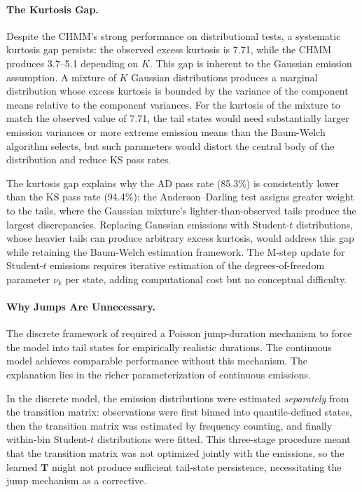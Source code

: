 \paragraph{The Kurtosis Gap.}
Despite the CHMM's strong performance on distributional tests, a systematic kurtosis gap persists: the observed excess kurtosis is 7.71, while the CHMM produces 3.7--5.1 depending on $K$.
This gap is inherent to the Gaussian emission assumption.
A mixture of $K$ Gaussian distributions produces a marginal distribution whose excess kurtosis is bounded by the variance of the component means relative to the component variances.
For the kurtosis of the mixture to match the observed value of 7.71, the tail states would need substantially larger emission variances or more extreme emission means than the Baum-Welch algorithm selects, but such parameters would distort the central body of the distribution and reduce KS pass rates.

The kurtosis gap explains why the AD pass rate (85.3\%) is consistently lower than the KS pass rate (94.4\%): the Anderson--Darling test assigns greater weight to the tails, where the Gaussian mixture's lighter-than-observed tails produce the largest discrepancies.
Replacing Gaussian emissions with Student-$t$ distributions, whose heavier tails can produce arbitrary excess kurtosis, would address this gap while retaining the Baum-Welch estimation framework.
The M-step update for Student-$t$ emissions requires iterative estimation of the degrees-of-freedom parameter $\nu_k$ per state, adding computational cost but no conceptual difficulty.

\paragraph{Why Jumps Are Unnecessary.}
The discrete framework of \citet{alswaidan2026hybrid} required a Poisson jump-duration mechanism to force the model into tail states for empirically realistic durations.
The continuous model achieves comparable performance without this mechanism.
The explanation lies in the richer parameterization of continuous emissions.

In the discrete model, the emission distributions were estimated \emph{separately} from the transition matrix: observations were first binned into quantile-defined states, then the transition matrix was estimated by frequency counting, and finally within-bin Student-$t$ distributions were fitted.
This three-stage procedure meant that the transition matrix was not optimized jointly with the emissions, so the learned $\mathbf{T}$ might not produce sufficient tail-state persistence, necessitating the jump mechanism as a corrective.

